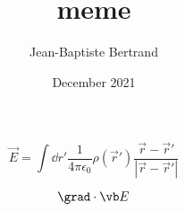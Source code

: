 \documentclass{article}
\title{meme}
\author{Jean-Baptiste Bertrand}
\date{December 2021}
\begin{document}
\begin{equation*}
\vec E = \int \dd r' \frac{1}{4\pi\epsilon_0}\rho(\vec r') \frac{\vec r -\vec r'}{|\vec r - \vec r'|}
\end{equation*}

\begin{equation*}
	\grad \cdot \vb E
\end{equation*}
\end{document}
